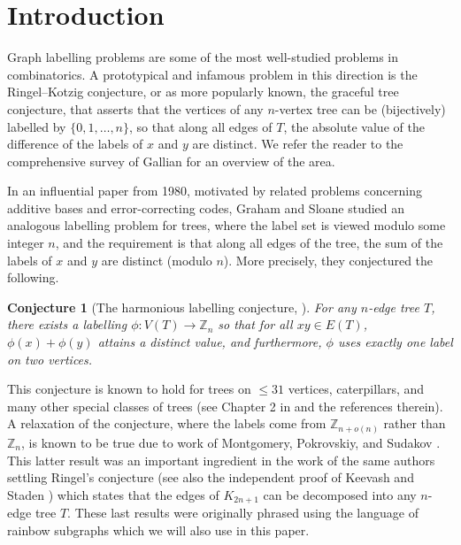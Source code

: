\documentclass[a4paper,11pt,hidelinks]{amsart}
\newtheorem{conjecture}[theorem]{Conjecture}
\theoremstyle{definition}
\begin{document}
\section{Introduction}
Graph labelling problems are some of the most well-studied problems in combinatorics. A prototypical and infamous problem in this direction is the Ringel--Kotzig conjecture, or as more popularly known, the graceful tree conjecture, that asserts that the vertices of any $n$-vertex tree can be (bijectively) labelled by $\{0,1,\ldots, n\}$, so that along all edges of $T$, the absolute value of the difference of the labels of $x$ and $y$ are distinct. We refer the reader to the comprehensive survey of Gallian \cite{labelling} for an overview of the area. 
\par In an influential paper from 1980, motivated by related problems concerning additive bases and error-correcting codes, Graham and Sloane \cite{graham1980additive} studied an analogous labelling problem for trees, where the label set is viewed modulo some integer $n$, and the requirement is that along all edges of the tree, the sum of the labels of $x$ and $y$ are distinct (modulo $n$). More precisely, they conjectured the following.
\begin{conjecture}[The harmonious labelling conjecture, \cite{graham1980additive}] For any $n$-edge tree $T$, there exists a labelling $\phi\colon V(T)\to \mathbb{Z}_n$ so that for all $xy\in E(T)$, $\phi(x)+\phi(y)$ attains a distinct value, and furthermore, $\phi$ uses exactly one label on two vertices. 
\end{conjecture}
This conjecture is known to hold for trees on $\leq 31$ vertices, caterpillars, and many other special classes of trees (see Chapter 2 in \cite{labelling} and the references therein). A relaxation of the conjecture, where the labels come from $\mathbb{Z}_{n+o(n)}$ rather than $\mathbb{Z}_n$, is known to be true due to work of Montgomery, Pokrovskiy, and Sudakov \cite{approximateringel}. This latter result was an important ingredient in the work of the same authors \cite{ringel} settling Ringel's conjecture (see also the independent proof of Keevash and Staden \cite{keevash2025ringel}) which states that the edges of $K_{2n+1}$ can be decomposed into any $n$-edge tree $T$. These last results were originally phrased using the language of rainbow subgraphs which we will also use in this paper. %
\end{document}
